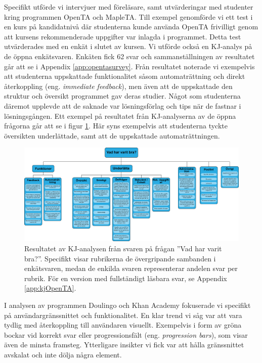 Specifikt utförde vi intervjuer med föreläsare, samt utvärderingar med studenter kring programmen OpenTA och MapleTA. Till exempel genomförde vi ett test i en kurs på kandidatnivå där studenterna kunde använda OpenTA frivilligt genom att kursens rekommenderade uppgifter var inlagda i programmet. Detta test utvärderades med en enkät i slutet av kursen. Vi utförde också en KJ-analys på de öppna enkätsvaren. Enkäten fick 62 svar och sammanställningen av resultatet går att se i Appendix \ref{app:opentasurvey}. Från resultatet noterade vi exempelvis att studenterna uppskattade funktionalitet såsom automaträttning och direkt återkoppling (eng. \emph{immediate feedback}), men även att de uppskattade den struktur och översikt programmet gav deras studier. Något som studenterna däremot upplevde att de saknade var lösningsförlag och tips när de fastnar i lösningsgången. Ett exempel på resultatet från KJ-analyserna av de öppna frågorna går att se i figur \ref{fig:raket1}. Här syns exempelvis att studenterna tyckte översikten underlättade, samt att de uppskattade automaträttningen.

\begin{figure}[hbtp]
    \centering
    \includegraphics[width=1\textwidth]{images/resultpictures/opentakj.png}
    \caption{Resultatet av KJ-analysen från svaren på frågan ''Vad har varit bra?''. Specifikt visar rubrikerna de övergripande sambanden i enkätsvaren, medan de enkilda svaren representerar andelen svar per rubrik. För en version med fullständigt läsbara svar, se Appendix \ref{app:kjOpenTA}.}
    \label{fig:raket1}
\end{figure}




I analysen av programmen Doulingo och Khan Academy fokuserade vi specifikt på användargränssnittet och funktionalitet. En klar trend vi såg var att vara tydlig med återkoppling till användaren visuellt. Exempelvis i form av gröna bockar vid korrekt svar eller progressionsfält (eng. \emph{progression bars}), som visar även de minsta framsteg. Ytterligare insikter vi fick var att hålla gränssnittet avskalat och inte dölja några element. 

